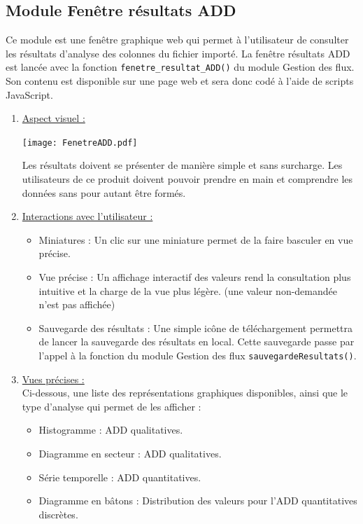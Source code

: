 			
		\subsection{Module Fenêtre résultats ADD}
			Ce module est une fenêtre graphique web qui permet à l'utilisateur de consulter les résultats d'analyse des colonnes du fichier importé. La fenêtre résultats ADD est lancée avec la fonction \lstinline!fenetre_resultat_ADD()! du module Gestion des flux. Son contenu est disponible sur une page web et sera donc codé à l'aide de scripts JavaScript.
			\begin{enumerate}
				\item \underline{Aspect visuel :}\\
					\begin{center}\texttt{[image: FenetreADD.pdf]}\end{center}
					Les résultats doivent se présenter de manière simple et sans surcharge. Les utilisateurs de ce produit doivent pouvoir prendre en main et comprendre les données sans pour autant être formés.
				\item \underline{Interactions avec l'utilisateur :}
					\begin{itemize}
						\item Miniatures : Un clic sur une miniature permet de la faire basculer en vue précise.
						\item Vue précise : Un affichage interactif des valeurs rend la consultation plus intuitive et la charge de la vue plus légère. (une valeur non-demandée n'est pas affichée)
						\item Sauvegarde des résultats : Une simple icône de téléchargement permettra de lancer la sauvegarde des résultats en local. Cette sauvegarde passe par l'appel à la fonction du module Gestion des flux \lstinline!sauvegardeResultats()!.
					\end{itemize}
				\item \underline{Vues précises :}\\
					Ci-dessous, une liste des représentations graphiques disponibles, ainsi que le type d'analyse qui permet de les afficher :
					\begin{itemize}
						\item Histogramme : ADD qualitatives.
						\item Diagramme en secteur : ADD qualitatives.
						\item Série temporelle : ADD quantitatives.
						\item Diagramme en bâtons : Distribution des valeurs pour l'ADD quantitatives discrètes.

\end{itemize}
\end{enumerate}
